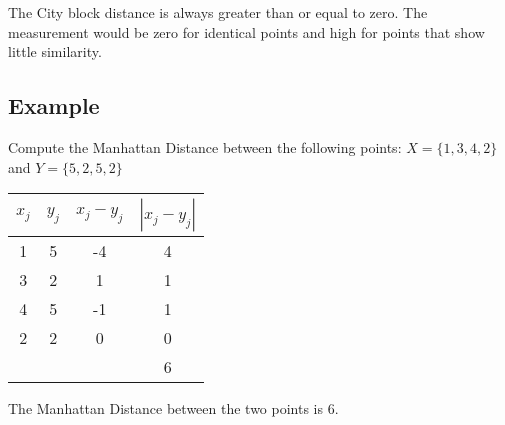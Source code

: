 The City block distance is always greater than or equal to zero. The measurement would be zero for identical points and high for points that show little similarity.

\subsection{Example}
Compute the Manhattan Distance between the following points: 
$X = \{1,3,4,2\}$ and $Y = \{5,2,5,2\}$


\begin{center}
\begin{tabular}{|c|c|c|c|}
  \hline
$x_j$	&	$y_j$	&   $x_j - y_j$	&	$| x_j - y_j |$	\\ \hline
1	&	5	&	-4	&	4	\\
3	&	2	&	1	&	1	\\
4	&	5	&	-1	&	1	\\
2	&	2	&	0	&	0	\\ \hline
& & & 6 \\
  \hline
\end{tabular}
\end{center}
The Manhattan Distance between the two points is 6.

